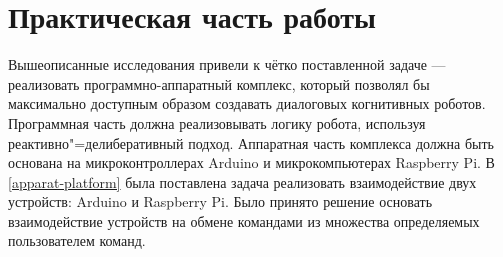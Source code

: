 \chapter{Практическая часть работы}

Вышеописанные исследования привели к чётко поставленной задаче --- реализовать программно-аппаратный комплекс, который позволял бы максимально доступным образом создавать диалоговых когнитивных роботов. Программная часть должна реализовывать логику робота, используя реактивно"=делиберативный подход. Аппаратная часть комплекса должна быть основана на микроконтроллерах Arduino и микрокомпьютерах Raspberry Pi. В \ref{apparat-platform} была поставлена задача реализовать взаимодействие двух устройств: Arduino и Raspberry Pi. Было принято решение основать взаимодействие устройств на обмене командами из множества определяемых пользователем команд.

